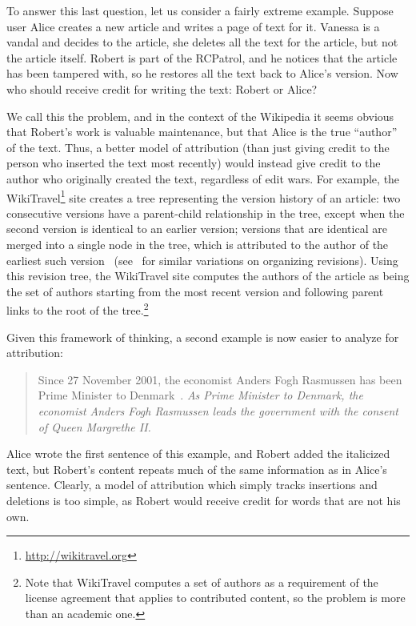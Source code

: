 To answer this last question, let us consider a fairly extreme example.
Suppose user Alice creates a new article and writes a page of text for it.
Vanessa is a vandal and decides to  the article,
\ie she deletes all the text for the article, but not the article itself.
Robert is part of the RCPatrol, and he notices that the article has
been tampered with, so he restores all the text back to Alice's version.
Now who should receive credit for writing the text: Robert or Alice?

We call this the  problem,
and in the context of the Wikipedia it seems obvious that Robert's
work is valuable maintenance, but that Alice is the true ``author'' of the text.
Thus, a better model of attribution (than just giving credit
to the person who inserted the text most recently) would instead give credit
to the author who originally created the text,
regardless of edit wars.
For example, the WikiTravel\footnote{\url{http://wikitravel.org}}
site creates a tree representing
the version history of an article: two consecutive versions
have a parent-child relationship in the tree, except when
the second version is identical to an earlier version;
versions that are identical are merged into a single node
in the tree, which is attributed to the author of the earliest
such version~\cite{WikiTravelAuthorship}
(see~\cite{Ekstrand2009,Sabel2007} for similar variations
on organizing revisions).
Using this revision tree, the WikiTravel site computes the
authors of the article as being the set of authors starting
from the most recent version and following parent links
to the root of the tree.\footnote{Note that WikiTravel
computes a set of authors as a requirement
of the license agreement that applies to contributed content,
so the problem is more than an academic one.}


Given this framework of thinking,
a second example is now easier to analyze for attribution:
%
\begin{quote}
Since 27 November 2001, the economist Anders Fogh Rasmussen
has been Prime Minister to Denmark~\cite{wiki:Denmark-Fogh}.
\textit{As Prime Minister to Denmark, the economist Anders Fogh Rasmussen
leads the government with the consent of Queen Margrethe II.}
\end{quote}
%
Alice wrote the first sentence of this example, and Robert
added the italicized text,
but Robert's content repeats much of the same information as
in Alice's sentence.
Clearly, a model of attribution which simply tracks insertions
and deletions is too simple, as Robert
would receive credit for words that are not his own.



